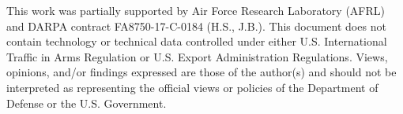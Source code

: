 \documentclass{article}
\begin{document}
\vspace{\baselineskip}

This work was partially supported by Air Force Research Laboratory (AFRL) and DARPA contract FA8750-17-C-0184 (H.S., J.B.). This document does not contain technology or technical data controlled under either U.S. International Traffic in Arms Regulation or
U.S. Export Administration Regulations. Views, opinions, and/or findings expressed are those of the author(s) and should not be interpreted as representing the official views or policies of the Department of Defense or the U.S. Government.
\end{document}
